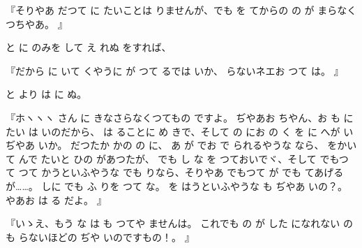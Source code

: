 『そりやあ
だつて
に
たいことは
りませんが、でも
を
てからの
の
が
まらなくつちやあ。
』

と
に
のみを
して
え
れぬ
をすれば、

『だから
に
いて
くやうに
が
つて
るでは
いか、
らないネエお
つて
は。
』

と
より
は
に
ぬ。

『ホヽヽヽ
さん
に
きなさらなくつてもの
ですよ。
ぢやあお
ちやん、お
も
に
たい
は
いのだから、
は
ることに
め
きで、そして
の
にお
の
く
を
に
へが
いぢやあ
いか。
だつたか
かの
の
に、
あ
が
でお
で
られるやうな
なら、
をかいて
んで
たいと
ひの
があつたが、
でも
し
な
を
つておいでヾ、そして
でもつて
つて
かうといふやうな
でも
りなら、そりやあ
でもつて
が
でも
てあげるが……。
しに
でも
ふ
りを
つて
な。
を
はうといふやうな
も
ぢやあ
いの？。
やあお
は
る
だよ。
』

『いゝえ、もう
な
は
も
つてや
ませんは。
これでも
の
が
した
になれない
の
も
らないほどの
ぢや
いのですもの！。
』

